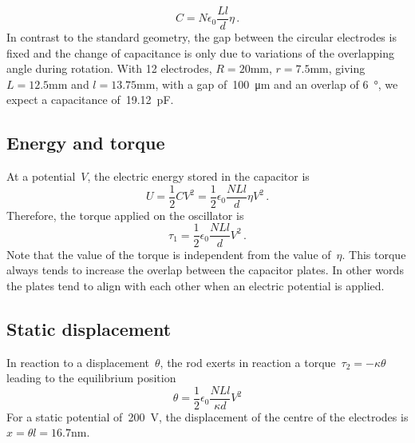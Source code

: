 \begin{equation}
\label{eq.circularCapacitance}
C = N \epsilon_0\frac{L l}{d}\eta \,.
\end{equation}
In contrast to the standard geometry, the gap between the circular electrodes is fixed and the change of capacitance is only due to variations of the overlapping angle during rotation. With 12 electrodes, $R = \si{\num{20}\milli\meter}$, $r = \si{\num{7.5}\milli\meter}$, giving $L = \si{\num{12.5}\milli\meter}$ and $l = \si{\num{13.75}\milli\meter}$, with a gap of~\si{\num{100}\micro\meter} and an overlap of \si{\num{6}\degree}, we expect a capacitance of~\si{\num{19.12}\pico\farad}.

\subsection{Energy and torque}
At a potential~$V$, the electric energy stored in the capacitor is
\begin{equation}
U = \frac{1}{2} C V^2 = \frac{1}{2} \epsilon_0 \frac{N L l}{d} \eta V^2 \,.
\end{equation}
Therefore, the torque applied on the oscillator is
\begin{equation}
\label{Eq.OscDrive2}
\tau_1 = \frac{1}{2}\epsilon_0 \frac{N L l}{d} V^2 \,.
\end{equation}
Note that the value of the torque is independent from the value of~$\eta$. This torque always tends to increase the overlap between the capacitor plates. In other words the plates tend to align with each other when an electric potential is applied.

\subsection{Static displacement}
In reaction to a displacement~$\theta$, the rod exerts in reaction a torque~$\tau_2 = -\kappa\theta$ leading to the equilibrium position
\begin{equation}
	\theta = \frac{1}{2}\epsilon_0 \frac{N L l}{\kappa d} V^2
\end{equation}
For a static potential of~\si{\num{200}\volt}, the displacement of the centre of the electrodes is $x = \theta l = \si{\num{16.7}\nano\meter}$.

